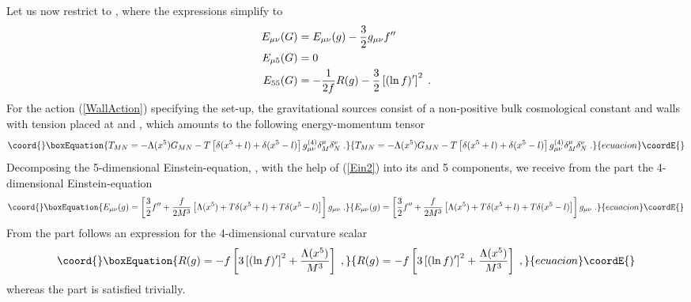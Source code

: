 \documentclass[a4paper,12pt]{article}
\begin{document}
Let us now restrict to \coordHE{}, where the expressions simplify to
\begin{alignat}{3}
  E_{\mu\nu}(G) &= E_{\mu\nu}(g)-\frac{3}{2}g_{\mu\nu}f^{\prime\prime} 
   \notag \\
  E_{\mu 5}(G) &= 0 
   \label{Ein2} \\
  E_{55}(G) &= -\frac{1}{2f}R(g)
               -\frac{3}{2}\left[(\ln f)^\prime\right]^2 
    \; . \notag
\end{alignat}
For the action (\ref{WallAction}) specifying the set-up, the gravitational
sources consist of a non-positive bulk cosmological constant \coordHE{} and walls with tension \coordHE{} placed at \coordHE{} and \coordHE{}, which amounts to
the following energy-momentum tensor
\begin{equation}\coord{}\boxEquation{
  T_{MN} = -\Lambda(x^5) G_{MN} - T\left[\delta(x^5+l)+\delta(x^5-l)\right]
            g^{(4)}_{\mu\nu}\delta^\mu_M\delta^\nu_N \; .
}{
  T_{MN} = -\Lambda(x^5) G_{MN} - T\left[\delta(x^5+l)+\delta(x^5-l)\right]
            g^{(4)}_{\mu\nu}\delta^\mu_M\delta^\nu_N \; .
}{ecuacion}\coordE{}\end{equation}
Decomposing the 5-dimensional Einstein-equation, \coordHE{},
with the help of (\ref{Ein2}) into its \myHighlight{$\mu$}\coordHE{} and 5 components, we
receive from the \myHighlight{$\mu\nu$}\coordHE{} part the 4-dimensional Einstein-equation
\begin{equation}\coord{}\boxEquation{
  E_{\mu\nu}(g)=\left[ \frac{3}{2}f^{\prime\prime}+\frac{f}{2M^3}
                       \left[ \Lambda(x^5)+T\delta(x^5+l)+T\delta(x^5-l)
                       \right]
                \right] g_{\mu\nu} \; .
  \label{FourEinstein}
}{
  E_{\mu\nu}(g)=\left[ \frac{3}{2}f^{\prime\prime}+\frac{f}{2M^3}
                       \left[ \Lambda(x^5)+T\delta(x^5+l)+T\delta(x^5-l)
                       \right]
                \right] g_{\mu\nu} \; .
  }{ecuacion}\coordE{}\end{equation}
From the \coordHE{} part follows an expression for the 4-dimensional curvature scalar
\begin{equation}\coord{}\boxEquation{
  R(g)=-f\left[3\left[(\ln f)^\prime\right]^2+\frac{\Lambda(x^5)}{M^3}
         \right] \; ,
  \label{FourScalar}
}{
  R(g)=-f\left[3\left[(\ln f)^\prime\right]^2+\frac{\Lambda(x^5)}{M^3}
         \right] \; ,
  }{ecuacion}\coordE{}\end{equation}
whereas the \coordHE{} part is satisfied trivially.
\end{document}
